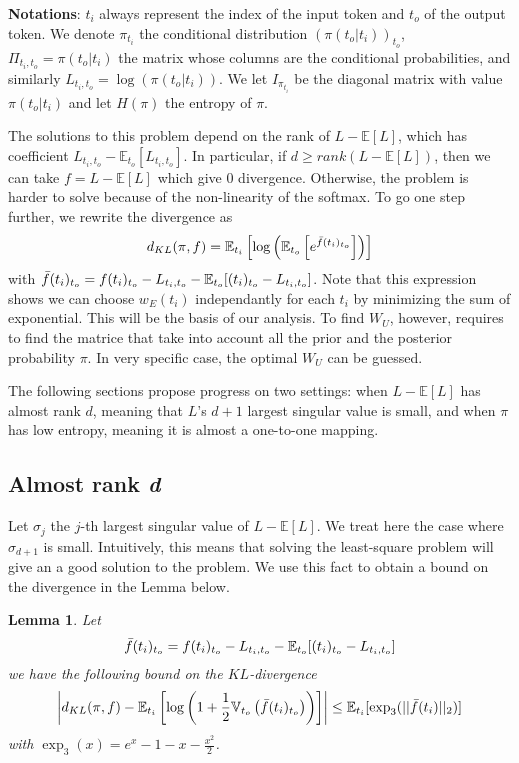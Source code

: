 \documentclass{article}
\newtheorem{lemma}{Lemma}
\begin{document}
\noindent \textbf{Notations}: $t_i$ always represent the index of the input token and $t_o$ of the output token. We denote $\pi_{t_i}$ 
the conditional distribution $(\pi(t_o|t_i))_{t_o}$, $\Pi_{t_i,t_o}=\pi(t_o|t_i)$ the matrix whose columns are the conditional probabilities, 
and similarly $L_{t_i,t_o}=\log(\pi(t_o|t_i))$. We let $I_{\pi_{t_i}}$ be the diagonal matrix with value $\pi(t_o|t_i)$ and let $H(\pi)$ the 
entropy of $\pi$.
\bigbreak

The solutions to this problem depend on the rank of $L - \mathbb{E}[L]$, which has coefficient $L_{t_i,t_o} - \mathbb{E}_{t_o}[L_{t_i,t_o}]$. 
In particular, if $d \geq rank(L-\mathbb{E}[L])$, then we can take 
$f = L-\mathbb{E}[L]$ which give 0 divergence. Otherwise, the problem is harder to solve because of the non-linearity of the softmax.
To go one step further, we rewrite the divergence as \[d_{KL}(\pi, f) = \mathbb{E}_{t_i}\left[\log\left(\mathbb{E}_{t_o}\left[e^{\Bar{f}(t_i)_{t_o}}\right]\right)\right]\] with 
$\Bar{f}(t_i)_{t_o} = f(t_i)_{t_o}-L_{t_i,t_o} - \mathbb{E}_{t_o}[(t_i)_{t_o}-L_{t_i,t_o}]$. Note that this expression shows we can choose $w_E(t_i)$ independantly for
each $t_i$ by minimizing the sum of exponential. This will be the basis of our analysis. To find $W_U$, however, requires to find the matrice that 
take into account all the prior and the posterior probability $\pi$. In very specific case, the optimal $W_U$ can be guessed.
\bigbreak

The following sections propose progress on two settings: when $L-\mathbb{E}[L]$ has almost rank $d$, meaning that $L$'s $d+1$ largest singular 
value is small, and when $\pi$ has low entropy, meaning it is almost a one-to-one mapping.
\bigbreak

\subsection{Almost rank \textit{d}}

Let $\sigma_j$ the $j$-th largest singular value of $L - \mathbb{E}[L]$. 
We treat here the case where $\sigma_{d+1}$ is small. Intuitively, this means that solving the least-square problem will give an
a good solution to the problem. We use this fact to obtain a bound on the divergence in the Lemma below.
\bigbreak

\begin{lemma}
    Let \[\Bar{f}(t_i)_{t_o} = f(t_i)_{t_o}-L_{t_i,t_o} - \mathbb{E}_{t_o}[(t_i)_{t_o}-L_{t_i,t_o}]\] 
    we have the following bound on the $KL$-divergence
    \[\left|d_{KL}(\pi, f) - \mathbb{E}_{t_i}\left[\log\left(1+\frac{1}{2}\mathbb{V}_{t_o}\left(\Bar{f}(t_i)_{t_o}\right)\right)\right]\right| 
    \leq 
    \mathbb{E}_{t_i}[\exp_3(||\Bar{f}(t_i)||_2)]\]
    with $\exp_3(x) = e^x-1-x-\frac{x^2}{2}$.
\end{lemma}
\bigbreak
\end{document}
